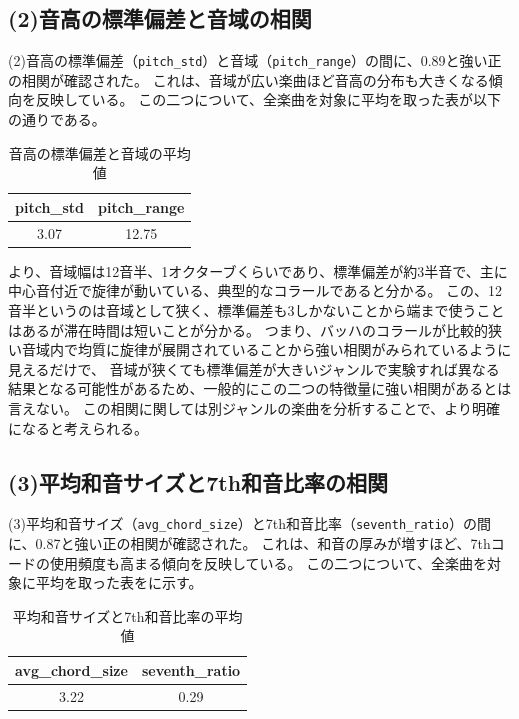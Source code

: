 \subsection{(2)音高の標準偏差と音域の相関}
(2)音高の標準偏差（\texttt{pitch\_std}）と音域（\texttt{pitch\_range}）の間に、0.89と強い正の相関が確認された。
これは、音域が広い楽曲ほど音高の分布も大きくなる傾向を反映している。
この二つについて、全楽曲を対象に平均を取った表が以下の通りである。

\begin{table}[t]
  \centering
  \caption{音高の標準偏差と音域の平均値}
  \label{tab:pitch}
  \begin{tabular}{cc}\hline
    pitch\_std & pitch\_range \\\hline\hline
    3.07       & 12.75        \\\hline
  \end{tabular}
\end{table}

より、音域幅は12音半、1オクターブくらいであり、標準偏差が約3半音で、主に中心音付近で旋律が動いている、典型的なコラールであると分かる。
この、12音半というのは音域として狭く、標準偏差も3しかないことから端まで使うことはあるが滞在時間は短いことが分かる。
つまり、バッハのコラールが比較的狭い音域内で均質に旋律が展開されていることから強い相関がみられているように見えるだけで、
音域が狭くても標準偏差が大きいジャンルで実験すれば異なる結果となる可能性があるため、一般的にこの二つの特徴量に強い相関があるとは言えない。
この相関に関しては別ジャンルの楽曲を分析することで、より明確になると考えられる。

\subsection{(3)平均和音サイズと7th和音比率の相関}
(3)平均和音サイズ（\texttt{avg\_chord\_size}）と7th和音比率（\texttt{seventh\_ratio}）の間に、0.87と強い正の相関が確認された。
これは、和音の厚みが増すほど、7thコードの使用頻度も高まる傾向を反映している。
この二つについて、全楽曲を対象に平均を取った表をに示す。
\begin{table}[t]
  \centering
  \caption{平均和音サイズと7th和音比率の平均値}
  \label{tab:chord}
  \begin{tabular}{cc}\hline
    avg\_chord\_size & seventh\_ratio \\ \hline\hline
    3.22             & 0.29           \\\hline
  \end{tabular}
\end{table}

